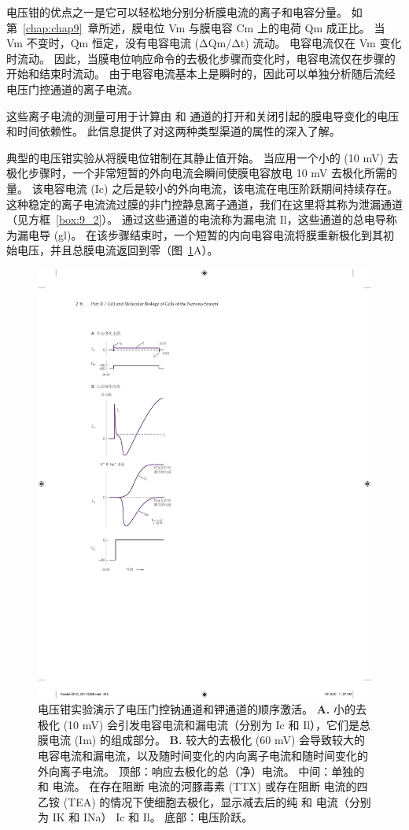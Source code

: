 


电压钳的优点之一是它可以轻松地分别分析膜电流的离子和电容分量。
如第~\ref{chap:chap9}~章所述，膜电位 Vm 与膜电容 Cm 上的电荷 Qm 成正比。
当 Vm 不变时，Qm 恒定，没有电容电流 (ΔQm/Δt) 流动。
电容电流仅在 Vm 变化时流动。
因此，当膜电位响应命令的去极化步骤而变化时，电容电流仅在步骤的开始和结束时流动。
由于电容电流基本上是瞬时的，因此可以单独分析随后流经电压门控通道的离子电流。


这些离子电流的测量可用于计算由  和  通道的打开和关闭引起的膜电导变化的电压和时间依赖性。
此信息提供了对这两种类型渠道的属性的深入了解。


典型的电压钳实验从将膜电位钳制在其静止值开始。
当应用一个小的 (10 mV) 去极化步骤时，一个非常短暂的外向电流会瞬间使膜电容放电 10 mV 去极化所需的量。
该电容电流 (Ic) 之后是较小的外向电流，该电流在电压阶跃期间持续存在。
这种稳定的离子电流流过膜的非门控静息离子通道，我们在这里将其称为泄漏通道（见方框~\ref{box:9_2}）。
通过这些通道的电流称为漏电流 Il，这些通道的总电导称为漏电导 (gl)。
在该步骤结束时，一个短暂的内向电容电流将膜重新极化到其初始电压，并且总膜电流返回到零（图~\ref{fig:10_3}A）。


\begin{figure}[htbp]
	\centering
	\includegraphics[width=0.4\linewidth]{chap10/fig_10_3}
	\caption{电压钳实验演示了电压门控钠通道和钾通道的顺序激活。 
		\textbf{A.} 小的去极化 (10 mV) 会引发电容电流和漏电流（分别为 Ic 和 Il），它们是总膜电流 (Im) 的组成部分。
		\textbf{B.} 较大的去极化 (60 mV) 会导致较大的电容电流和漏电流，以及随时间变化的内向离子电流和随时间变化的外向离子电流。
		顶部：响应去极化的总（净）电流。
		中间：单独的  和  电流。 在存在阻断  电流的河豚毒素 (TTX) 或存在阻断  电流的四乙铵 (TEA) 的情况下使细胞去极化，显示减去后的纯  和  电流（分别为 IK 和 INa） Ic 和 Il。
		底部：电压阶跃。}
	\label{fig:10_3}
\end{figure}


